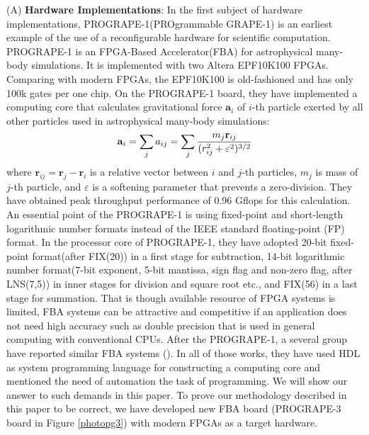 \documentclass{llncs}
\begin{document}
(A) {\bf Hardware Implementations}:
In the first subject of hardware implementations,
PROGRAPE-1(PROgrammable GRAPE-1)\cite{HFKM00} is
an earliest example of the use of a reconfigurable hardware for
scientific computation.  PROGRAPE-1 is an FPGA-Based Accelerator(FBA)
for astrophysical many-body simulations. It is implemented with two
Altera EPF10K100 FPGAs. Comparing with modern FPGAs, the EPF10K100 is
old-fashioned and has only 100k gates per one chip.
On the PROGRAPE-1 board, they have implemented a computing core
that calculates gravitational force
$\mathbf{a}_i$ of $i$-th particle exerted by all other particles
used in astrophysical many-body simulations:
\begin{equation}
\mathbf{ a}_i = \sum_j a_{ij} = \sum_j {m_j \mathbf{ r}_{ij} \over (r_{ij}^2 + \varepsilon^2)^{3/2}}
\end{equation}
where $\mathbf{r}_{ij} = \mathbf{r}_j - \mathbf{r}_i $ is a relative
vector between $i$ and $j$-th particles, $m_{j}$ is mass of $j$-th
particle, and $\varepsilon$ is a softening parameter that prevents a
zero-division.  They have obtained peak throughput performance of 0.96
Gflops for this calculation.  An essential point of the PROGRAPE-1 is
using fixed-point and short-length logarithmic number formats instead
of the IEEE standard floating-point (FP) format.  In the processor
core of PROGRAPE-1, they have adopted 20-bit fixed-point format(after
FIX(20)) in a first stage for subtraction, 14-bit logarithmic number
format(7-bit exponent, 5-bit mantissa, sign flag and non-zero flag,
after LNS(7,5)) in inner stages for division and square root etc., and
FIX(56) in a last stage for summation.  That is though available
resource of FPGA systems is limited, FBA systems can be attractive and
competitive if an application does not need high accuracy such as
double precision that is used in general computing with conventional
CPUs.  After the PROGRAPE-1, a several group have reported similar FBA
systems (\cite{LKM02}\cite{SS03}\cite{AKEDC04}).  In all of those
works, they have used HDL as system programming language for
constructing a computing core and mentioned the need of automation the
task of programming.  We will show our answer to such demands in this
paper.  To prove our methodology described in this paper to be
correct, we have developed new FBA board (PROGRAPE-3 board in Figure
\ref{photopg3}) with modern FPGAs as a target hardware.
\end{document}
